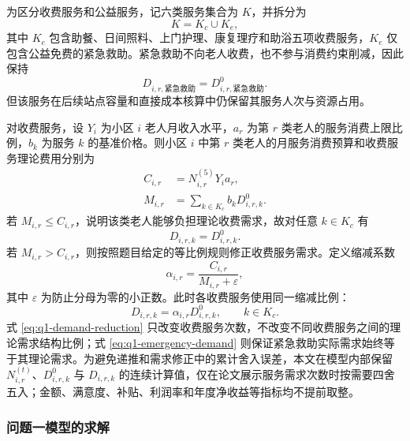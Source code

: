 为区分收费服务和公益服务，记六类服务集合为 $K$，并拆分为
\begin{equation}
  K=K_c\cup K_e,
  \label{eq:q1-service-set}
\end{equation}
其中 $K_c$ 包含助餐、日间照料、上门护理、康复理疗和助浴五项收费服务，$K_e$ 仅包含公益免费的紧急救助。紧急救助不向老人收费，也不参与消费约束削减，因此保持
\begin{equation}
  D_{i,r,\text{紧急救助}}=D_{i,r,\text{紧急救助}}^{0}.
  \label{eq:q1-emergency-demand}
\end{equation}
但该服务在后续站点容量和直接成本核算中仍保留其服务人次与资源占用。

对收费服务，设 $Y_i$ 为小区 $i$ 老人月收入水平，$a_r$ 为第 $r$ 类老人的服务消费上限比例，$b_k$ 为服务 $k$ 的基准价格。则小区 $i$ 中第 $r$ 类老人的月服务消费预算和收费服务理论费用分别为
\begin{align}
  C_{i,r}&=N_{i,r}^{(5)}Y_i a_r, \label{eq:q1-budget}\\
  M_{i,r}&=\sum_{k\in K_c}b_kD_{i,r,k}^{0}. \label{eq:q1-theoretical-fee}
\end{align}
若 $M_{i,r}\le C_{i,r}$，说明该类老人能够负担理论收费需求，故对任意 $k\in K_c$ 有
\begin{equation}
  D_{i,r,k}=D_{i,r,k}^{0}.
  \label{eq:q1-demand-retain}
\end{equation}
若 $M_{i,r}>C_{i,r}$，则按照题目给定的等比例规则修正收费服务需求。定义缩减系数
\begin{equation}
  \alpha_{i,r}=\frac{C_{i,r}}{M_{i,r}+\varepsilon},
  \label{eq:q1-demand-alpha}
\end{equation}
其中 $\varepsilon$ 为防止分母为零的小正数。此时各收费服务使用同一缩减比例：
\begin{equation}
  D_{i,r,k}=\alpha_{i,r}D_{i,r,k}^{0},
  \qquad k\in K_c.
  \label{eq:q1-demand-reduction}
\end{equation}
式 \eqref{eq:q1-demand-reduction} 只改变收费服务次数，不改变不同收费服务之间的理论需求结构比例；式 \eqref{eq:q1-emergency-demand} 则保证紧急救助实际需求始终等于其理论需求。为避免递推和需求修正中的累计舍入误差，本文在模型内部保留 $N_{i,r}^{(t)}$、$D_{i,r,k}^{0}$ 与 $D_{i,r,k}$ 的连续计算值，仅在论文展示服务需求次数时按需要四舍五入；金额、满意度、补贴、利润率和年度净收益等指标均不提前取整。

\subsubsection{问题一模型的求解}


